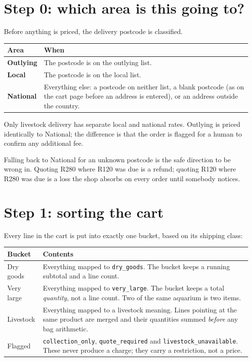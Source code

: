 \documentclass[11pt,a4paper,oneside]{report}
\newcommand{\opt}[1]{\texttt{\small #1}}
\newcommand{\R}[1]{R#1}
\begin{document}
\section{Step 0: which area is this going to?}

Before anything is priced, the delivery postcode is classified.

\begin{longtable}{@{}L{3.0cm}L{11.8cm}@{}}
\toprule
\textbf{Area} & \textbf{When}\\
\midrule
\endhead
\textbf{Outlying} & The postcode is on the outlying list.\\
\textbf{Local} & The postcode is on the local list.\\
\textbf{National} & Everything else: a postcode on neither list, a blank postcode
(as on the cart page before an address is entered), or an address outside the
country.\\
\bottomrule
\end{longtable}

Only livestock delivery has separate local and national rates. Outlying is priced
identically to National; the difference is that the order is flagged for a human to
confirm any additional fee.

\begin{houseinfo}
Falling back to National for an unknown postcode is the safe direction to be wrong
in. Quoting \R{280} where \R{120} was due is a refund; quoting \R{120} where \R{280}
was due is a loss the shop absorbs on every order until somebody notices.
\end{houseinfo}

\section{Step 1: sorting the cart}

Every line in the cart is put into exactly one bucket, based on its shipping class:

\begin{longtable}{@{}L{3.4cm}L{11.4cm}@{}}
\toprule
\textbf{Bucket} & \textbf{Contents}\\
\midrule
\endhead
Dry goods & Everything mapped to \opt{dry\_goods}. The bucket keeps a running subtotal
and a line count.\\
\addlinespace
Very large & Everything mapped to \opt{very\_large}. The bucket keeps a total
\emph{quantity}, not a line count. Two of the same aquarium is two items.\\
\addlinespace
Livestock & Everything mapped to a livestock meaning. Lines pointing at the same
product are merged and their quantities summed \emph{before} any bag arithmetic.\\
\addlinespace
Flagged & \opt{collection\_only}, \opt{quote\_required} and
\opt{livestock\_unavailable}. These never produce a charge; they carry a restriction,
not a price.\\
\bottomrule
\end{longtable}
\end{document}
